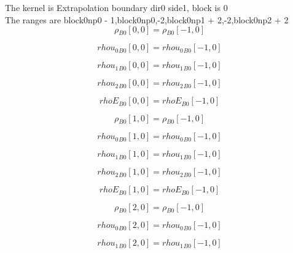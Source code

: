 \documentclass{article}
\begin{document}
\noindent The kernel is Extrapolation boundary dir0 side1, block is 0\\\noindent The ranges are block0np0 - 1,block0np0,-2,block0np1 + 2,-2,block0np2 + 2\\\begin{dmath}{\rho{_{B0}}}[{0,0}] = {\rho{_{B0}}}[{-1,0}]\end{dmath}

\begin{dmath}{rhou_{0}{_{B0}}}[{0,0}] = {rhou_{0}{_{B0}}}[{-1,0}]\end{dmath}

\begin{dmath}{rhou_{1}{_{B0}}}[{0,0}] = {rhou_{1}{_{B0}}}[{-1,0}]\end{dmath}

\begin{dmath}{rhou_{2}{_{B0}}}[{0,0}] = {rhou_{2}{_{B0}}}[{-1,0}]\end{dmath}

\begin{dmath}{rhoE{_{B0}}}[{0,0}] = {rhoE{_{B0}}}[{-1,0}]\end{dmath}

\begin{dmath}{\rho{_{B0}}}[{1,0}] = {\rho{_{B0}}}[{-1,0}]\end{dmath}

\begin{dmath}{rhou_{0}{_{B0}}}[{1,0}] = {rhou_{0}{_{B0}}}[{-1,0}]\end{dmath}

\begin{dmath}{rhou_{1}{_{B0}}}[{1,0}] = {rhou_{1}{_{B0}}}[{-1,0}]\end{dmath}

\begin{dmath}{rhou_{2}{_{B0}}}[{1,0}] = {rhou_{2}{_{B0}}}[{-1,0}]\end{dmath}

\begin{dmath}{rhoE{_{B0}}}[{1,0}] = {rhoE{_{B0}}}[{-1,0}]\end{dmath}

\begin{dmath}{\rho{_{B0}}}[{2,0}] = {\rho{_{B0}}}[{-1,0}]\end{dmath}

\begin{dmath}{rhou_{0}{_{B0}}}[{2,0}] = {rhou_{0}{_{B0}}}[{-1,0}]\end{dmath}

\begin{dmath}{rhou_{1}{_{B0}}}[{2,0}] = {rhou_{1}{_{B0}}}[{-1,0}]\end{dmath}
\end{document}
